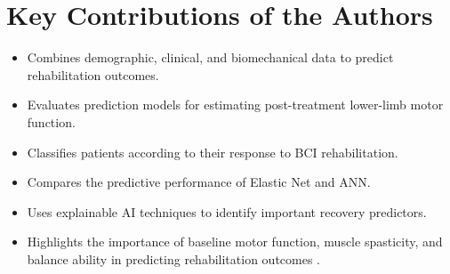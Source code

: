\section{Key Contributions of the Authors}

\begin{itemize}
    \item Combines demographic, clinical, and biomechanical data to predict rehabilitation outcomes.
    \item Evaluates prediction models for estimating post-treatment lower-limb motor function.
    \item Classifies patients according to their response to BCI rehabilitation.
    \item Compares the predictive performance of Elastic Net and ANN.
    \item Uses explainable AI techniques to identify important recovery predictors.
    \item Highlights the importance of baseline motor function, muscle spasticity, and balance ability in predicting rehabilitation outcomes \cite{bib1}.
\end{itemize}


